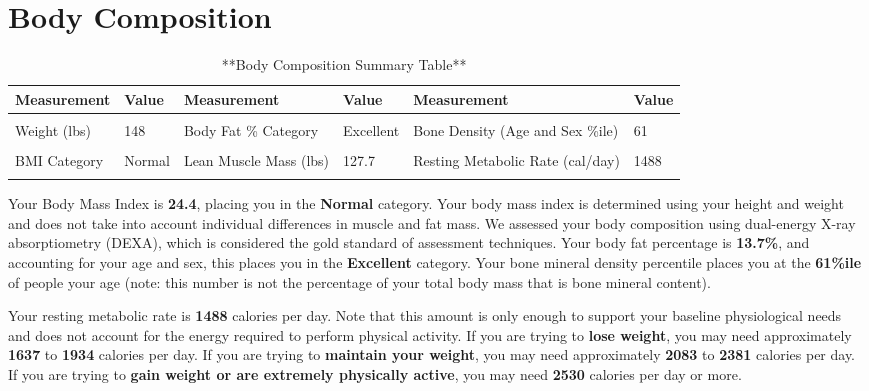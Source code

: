 \documentclass[
]{article}
\begin{document}
\newpage

\section{Body Composition}\label{body-composition}

\begin{longtable}[t]{llllll}
\caption{\label{tab:body-comp-table}**Body Composition Summary Table**}\\
\toprule
Measurement & Value & Measurement & Value & Measurement & Value\\
\midrule
\cellcolor{gray!10}{Height (in)} & \cellcolor{gray!10}{65.2} & \cellcolor{gray!10}{Body Fat (\% of Body Weight)} & \cellcolor{gray!10}{13.7} & \cellcolor{gray!10}{Bone Density (g/cm2)} & \cellcolor{gray!10}{1.188}\\
Weight (lbs) & 148 & Body Fat \% Category & Excellent & Bone Density (Age and Sex \%ile) & 61\\
\cellcolor{gray!10}{BMI} & \cellcolor{gray!10}{24.4} & \cellcolor{gray!10}{Fat Mass (lbs)} & \cellcolor{gray!10}{20.3} & \cellcolor{gray!10}{Bone Mineral Content (lbs)} & \cellcolor{gray!10}{6.3}\\
BMI Category & Normal & Lean Muscle Mass (lbs) & 127.7 & Resting Metabolic Rate (cal/day) & 1488\\
\cellcolor{gray!10}{} & \cellcolor{gray!10}{} & \cellcolor{gray!10}{Lean Muscle Mass (\% of Body Weight)} & \cellcolor{gray!10}{86.3} & \cellcolor{gray!10}{} & \cellcolor{gray!10}{}\\
\bottomrule
\end{longtable}

Your Body Mass Index is \textbf{24.4}, placing you in the
\textbf{Normal} category. Your body mass index is determined using your
height and weight and does not take into account individual differences
in muscle and fat mass. We assessed your body composition using
dual-energy X-ray absorptiometry (DEXA), which is considered the gold
standard of assessment techniques. Your body fat percentage is
\textbf{13.7\%}, and accounting for your age and sex, this places you in
the \textbf{Excellent} category. Your bone mineral density percentile
places you at the \textbf{61\%ile} of people your age (note: this number
is not the percentage of your total body mass that is bone mineral
content).

Your resting metabolic rate is \textbf{1488} calories per day. Note that
this amount is only enough to support your baseline physiological needs
and does not account for the energy required to perform physical
activity. If you are trying to \textbf{lose weight}, you may need
approximately \textbf{1637} to \textbf{1934} calories per day. If you
are trying to \textbf{maintain your weight}, you may need approximately
\textbf{2083} to \textbf{2381} calories per day. If you are trying to
\textbf{gain weight or are extremely physically active}, you may need
\textbf{2530} calories per day or more.
\end{document}
